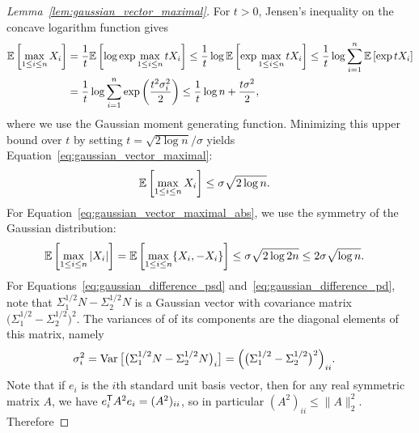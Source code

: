 \begin{proof}[Lemma~\ref{lem:gaussian_vector_maximal}]

  For $t > 0$,
  Jensen's inequality on the concave logarithm function
  gives
  \begin{align*}
    \mathbb{E}\left[
      \max_{1 \leq i \leq n}
      X_i
    \right]
    &=
    \frac{1}{t}
    \mathbb{E}\left[
      \log
      \exp
      \max_{1 \leq i \leq n}
      t X_i
    \right]
    \leq
    \frac{1}{t}
    \log
    \mathbb{E}\left[
      \exp
      \max_{1 \leq i \leq n}
      t X_i
    \right]
    \leq
    \frac{1}{t}
    \log
    \sum_{i=1}^n
    \mathbb{E}\left[
      \exp
      t X_i
    \right] \\
    &=
    \frac{1}{t}
    \log
    \sum_{i=1}^n
    \exp
    \left(
      \frac{t^2 \sigma_i^2}{2}
    \right)
    \leq
    \frac{1}{t}
    \log n
    + \frac{t \sigma^2}{2},
  \end{align*}
  where we use the Gaussian moment generating function.
  Minimizing this upper bound over $t$
  by setting $t = \sqrt{2 \log n} / \sigma$
  yields Equation~\ref{eq:gaussian_vector_maximal}:
  \begin{align*}
    \mathbb{E}\left[
      \max_{1 \leq i \leq n}
      X_i
    \right]
    &\leq
    \sigma \sqrt{2 \log n}.
  \end{align*}
  For Equation~\ref{eq:gaussian_vector_maximal_abs},
  we use the symmetry of the Gaussian distribution:
  \begin{align*}
    \mathbb{E}\left[
      \max_{1 \leq i \leq n}
      |X_i|
    \right]
    &=
    \mathbb{E}\left[
      \max_{1 \leq i \leq n}
      \{X_i, -X_i\}
    \right]
    \leq
    \sigma \sqrt{2 \log 2n}
    \leq
    2 \sigma \sqrt{\log n}.
  \end{align*}
  For
  Equations~\ref{eq:gaussian_difference_psd}
  and~\ref{eq:gaussian_difference_pd},
  note that
  $\Sigma_1^{1/2} N - \Sigma_2^{1/2} N$
  is a Gaussian vector with covariance matrix
  $\big(\Sigma_1^{1/2} - \Sigma_2^{1/2}\big)^2$.
  The variances of of its components are the diagonal
  elements of this matrix, namely
  \begin{align*}
    \sigma_i^2
    &=
    \operatorname{Var}\big[
      \big(\Sigma_1^{1/2} N - \Sigma_2^{1/2} N\big)_i
      \big]
    =
    \Big(\big(
    \Sigma_1^{1/2} - \Sigma_2^{1/2}
    \big)^2\Big)_{ii}.
  \end{align*}
  Note that if $e_i$ is the
  $i$th standard unit basis vector,
  then for any real symmetric matrix $A$,
  we have
  $e_i^{\mathsf{T}} A^2 e_i = (A^2)_{ii}$,
  so in particular
  $(A^2)_{ii} \leq \|A\|_2^2$.
  Therefore

\end{proof}
